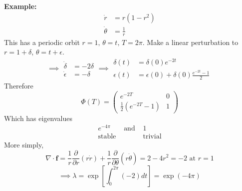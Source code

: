 \documentclass{article}
\newcommand{\example}{\textbf{Example:}}                    %
\begin{document}
\example\
\begin{align*}
\dot{r} &= r(1-r^2) \\
\dot{\theta} &= \frac{1}{r}
\end{align*}
This has a periodic orbit $r =1, \, \theta = t, \, T = 2\pi$. Make a linear
perturbation to $r = 1+ \delta$, $\theta = t+\epsilon$.
\[ \implies \begin{array}{rl}
\dot{\delta}   &=  -2\delta \\
\dot{\epsilon} &=  - \delta \end{array} \implies
\begin{array}{rl} 
\delta(t)   &= \delta(0) e^{-2t} \\
\epsilon(t) &= \epsilon(0) + \delta(0) \frac{e^{-2t} -1}{2} \end{array} \]
Therefore
\[ \Phi(T) = \left( \begin{array}{cc} e^{-2T} & 0 \\ \frac{1}{2}(e^{-2T}-1) & 1 
\end{array} \right) \]
Which has eigenvalues 
\[ \begin{array}{ccc}
e^{-4\pi} & \mbox{ and } & 1 \\
\mbox{stable} & & \mbox{trivial} 
\end{array} \]
More simply, 
\[ \nabla \cdot \bm{f} = \frac{1}{r} \frac{\partial}{\partial r}(r \dot{r}) 
+ \frac{1}{r}\frac{\partial}{\partial \theta}(r \dot{\theta}) = 2 - 4r^2 = -2
\mbox{ at } r=1 \]
\[ \implies \lambda = \exp \left[ \int_0^{2\pi} (-2) dt \right] = \exp(-4\pi) \]
\\
\end{document}
